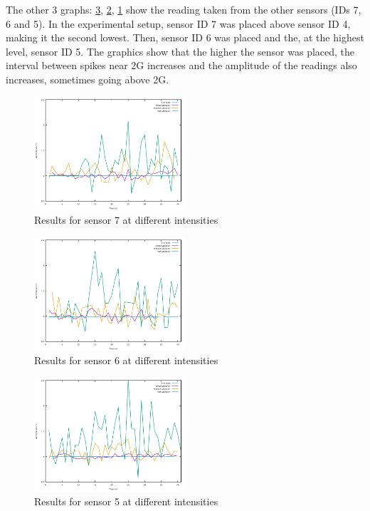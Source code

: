 The other 3 graphs: \ref{fig:sensor-5}, \ref{fig:sensor-6}, \ref{fig:sensor-7} show the reading taken from the other sensors (IDs 7, 6 and 5). In the experimental setup, sensor ID 7 was placed above sensor ID 4, making it 
the second lowest. Then, sensor ID 6 was placed and the, at the highest level, sensor ID 5. The graphics show that the higher the sensor was placed, the interval between spikes near 2G increases and the 
amplitude of the readings also increases, sometimes going above 2G.

\begin{figure}[ht] \centering
  \includegraphics[width=0.5\textwidth]{img/sensor-7-data}
  \caption{Results for sensor 7 at different intensities}
  \label{fig:sensor-7}
\end{figure}

\begin{figure}[ht] \centering
  \includegraphics[width=0.5\textwidth]{img/sensor-6-data}
  \caption{Results for sensor 6 at different intensities}
  \label{fig:sensor-6}
\end{figure}

\begin{figure}[ht] \centering
  \includegraphics[width=0.5\textwidth]{img/sensor-5-data}
  \caption{Results for sensor 5 at different intensities}
  \label{fig:sensor-5}
\end{figure}

